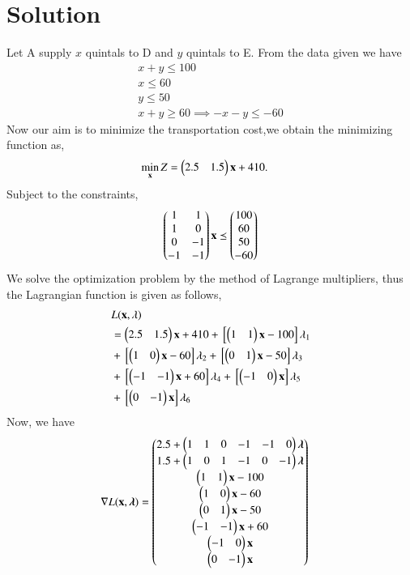\documentclass[journal,12pt,twocolumn]{IEEEtran}
\begin{document}
\section{Solution}
Let A supply $x$ quintals to D and $y$ quintals to E.
From the data given we have 
\begin{align}
    x+y\leq100 \\
    x\leq60 \\ 
    y\leq50 \\
    x+y\geq60 \implies -x-y\leq-60
\end{align}
Now our aim is to minimize the transportation cost,we obtain the minimizing function as,
\begin{align}
    \min_{\mathbf{x}} Z &= \begin{pmatrix}2.5 & 1.5\end{pmatrix}\mathbf{x}+410.
\end{align}
Subject to the constraints,
\begin{align}
    \begin{pmatrix}1 & 1 \\ 1 & 0 \\ 0 & -1 \\ -1 & -1\end{pmatrix}\mathbf{x} \preceq \begin{pmatrix}100 \\ 60 \\ 50 \\ -60\end{pmatrix}
\end{align}
We solve the optimization problem by the method of Lagrange multipliers, thus the Lagrangian function is given as follows,
\begin{equation}
  \begin{aligned}
     &L(\mathbf{x},\lambda) \\ &= \begin{pmatrix}2.5 & 1.5\end{pmatrix}\mathbf{x}+410+{}\left[\begin{pmatrix}1 & 1\end{pmatrix}\mathbf{x}-100\right]\lambda_1 \\ &+ {}\left[\begin{pmatrix}1 & 0\end{pmatrix}\mathbf{x}-60\right]\lambda_2 +{}\left[\begin{pmatrix}0 & 1\end{pmatrix}\mathbf{x}-50\right]\lambda_3 \\ &+ {}\left[\begin{pmatrix}-1 & -1\end{pmatrix}\mathbf{x}+60\right]\lambda_4 +{}\left[\begin{pmatrix}-1 & 0\end{pmatrix}\mathbf{x}\right]\lambda_5 \\ &+{}\left[\begin{pmatrix}0 & -1\end{pmatrix}\mathbf{x}\right]\lambda_6
\end{aligned}  
\end{equation}
Now, we have 
\begin{align}
    \nabla L(\mathbf{x},\boldsymbol{\lambda}) &= \begin{pmatrix}2.5+ \begin{pmatrix}1 & 1 & 0 & -1 & -1 & 0\end{pmatrix}\boldsymbol{\lambda}\\ 1.5+\begin{pmatrix}1 & 0 & 1 & -1 & 0 & -1\end{pmatrix}\boldsymbol{\lambda} \\ \begin{pmatrix}1 & 1\end{pmatrix}\mathbf{x}-100 \\ \begin{pmatrix}1 & 0\end{pmatrix}\mathbf{x}-60 \\ \begin{pmatrix}0 & 1\end{pmatrix}\mathbf{x}-50 \\ \begin{pmatrix}-1 & -1\end{pmatrix}\mathbf{x}+60 \\ \begin{pmatrix}-1 & 0\end{pmatrix}\mathbf{x} \\ \begin{pmatrix}0 & -1\end{pmatrix}\mathbf{x}\end{pmatrix}
\end{align}
\end{document}
